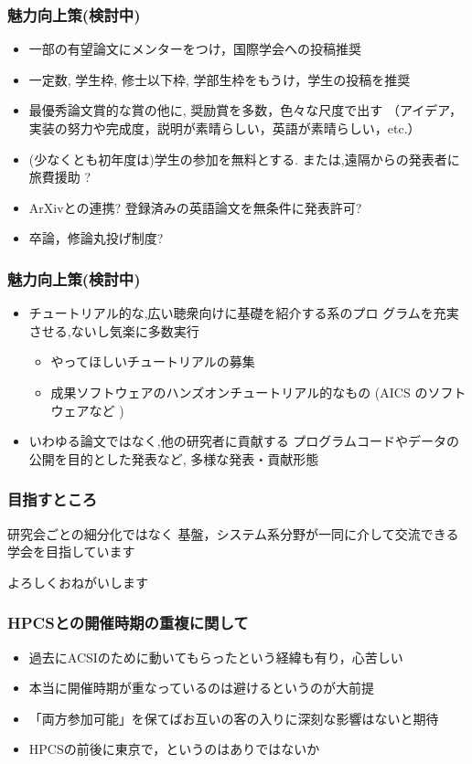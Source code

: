\documentclass[12pt,dvipdfmx]{beamer}
\newcommand{\ao}[1]{{\color{blue}#1}}
\begin{document}
\begin{frame}
\frametitle{魅力向上策(検討中)}
\begin{itemize}
\item 一部の有望論文に\ao{メンター}をつけ，国際学会への投稿推奨
\item 一定数, \ao{学生枠, 修士以下枠, 学部生枠}をもうけ，学生の投稿を推奨
\item 最優秀論文賞的な賞の他に, \ao{奨励賞を多数，色々な尺度}で出す
（アイデア，実装の努力や完成度，説明が素晴らしい，英語が素晴らしい，etc.）
\item (少なくとも初年度は)学生の参加を無料とする.
または,遠隔からの発表者に旅費援助 ?
\item \ao{ArXiv}との連携? 登録済みの英語論文を無条件に発表許可?
\item 卒論，修論\ao{丸投げ}制度?
\end{itemize}
\end{frame}


\begin{frame}
\frametitle{魅力向上策(検討中)}
\begin{itemize}
\item \ao{チュートリアル的}な,広い聴衆向けに基礎を紹介する系のプロ
グラムを充実させる,ないし気楽に多数実行
\begin{itemize}
\item やってほしいチュートリアルの\ao{募集}
\item \ao{成果ソフトウェアのハンズオン}チュートリアル的なもの 
  (AICS のソフトウェアなど )
\end{itemize}
\item いわゆる論文ではなく,他の研究者に貢献する
\ao{プログラムコードやデータ}の公開を目的とした発表など, 多様な発表・貢献形態
\end{itemize}
\end{frame}

\begin{frame}
\frametitle{目指すところ}
研究会ごとの細分化ではなく
基盤，システム系分野が一同に介して交流できる学会を目指しています


{\huge よろしくおねがいします}

\end{frame}


\begin{frame}
\frametitle{HPCSとの開催時期の重複に関して}
\begin{itemize}
\item 過去にACSIのために動いてもらったという経緯も有り，心苦しい
\item 本当に開催時期が重なっているのは避けるというのが大前提
\item 「両方参加可能」を保てばお互いの客の入りに深刻な影響はないと期待
\item HPCSの前後に東京で，というのはありではないか
\end{itemize}
\end{frame}
\end{document}
